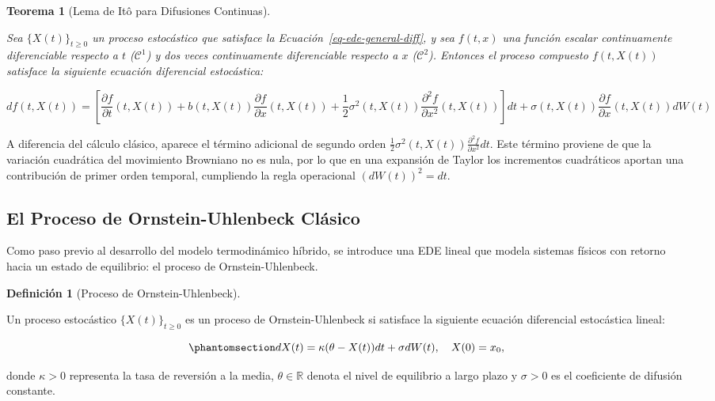 \documentclass[
  spanish,
  letterpaper,
  DIV=11,
  numbers=noendperiod]{scrreprt}
\theoremstyle{plain}
\theoremstyle{plain}
\newtheorem{theorem}{Teorema}[chapter]
\theoremstyle{plain}
\theoremstyle{definition}
\newtheorem{definition}{Definición}[chapter]
\theoremstyle{remark}
\begin{document}
\begin{theorem}[Lema de Itô para Difusiones
Continuas]\protect\hypertarget{thm-ito-clasico}{}\label{thm-ito-clasico}

Sea \(\{X(t)\}_{t \ge 0}\) un proceso estocástico que satisface la
Ecuación~\ref{eq-ede-general-diff}, y sea \(f(t, x)\) una función
escalar continuamente diferenciable respecto a \(t\) (\(\mathcal{C}^1\))
y dos veces continuamente diferenciable respecto a \(x\)
(\(\mathcal{C}^2\)). Entonces el proceso compuesto \(f(t, X(t))\)
satisface la siguiente ecuación diferencial estocástica:

\[
df(t, X(t)) = \left[ \frac{\partial f}{\partial t} (t, X(t)) + b(t, X(t))\frac{\partial f}{\partial x} (t, X(t)) + \frac{1}{2}\sigma^2(t, X(t))\frac{\partial^2 f}{\partial x^2} (t, X(t)) \right] dt + \sigma(t, X(t))\frac{\partial f}{\partial x} (t, X(t)) dW(t)
\]

\end{theorem}

A diferencia del cálculo clásico, aparece el término adicional de
segundo orden
\(\frac{1}{2}\sigma^2(t, X(t))\frac{\partial^2 f}{\partial x^2} dt\).
Este término proviene de que la variación cuadrática del movimiento
Browniano no es nula, por lo que en una expansión de Taylor los
incrementos cuadráticos aportan una contribución de primer orden
temporal, cumpliendo la regla operacional \((dW(t))^2 = dt\).

\subsection{El Proceso de Ornstein-Uhlenbeck
Clásico}\label{el-proceso-de-ornstein-uhlenbeck-cluxe1sico}

Como paso previo al desarrollo del modelo termodinámico híbrido, se
introduce una EDE lineal que modela sistemas físicos con retorno hacia
un estado de equilibrio: el proceso de Ornstein-Uhlenbeck.

\begin{definition}[Proceso de
Ornstein-Uhlenbeck]\protect\hypertarget{def-ou-clasico}{}\label{def-ou-clasico}

Un proceso estocástico \(\{X(t)\}_{t \ge 0}\) es un proceso de
Ornstein-Uhlenbeck si satisface la siguiente ecuación diferencial
estocástica lineal:

\begin{equation}\phantomsection\label{eq-ou-clasica}{
dX(t) = \kappa (\theta - X(t)) dt + \sigma dW(t), \quad X(0) = x_0,
}\end{equation}

donde \(\kappa > 0\) representa la tasa de reversión a la media,
\(\theta \in \mathbb{R}\) denota el nivel de equilibrio a largo plazo y
\(\sigma > 0\) es el coeficiente de difusión constante.

\end{definition}
\end{document}
